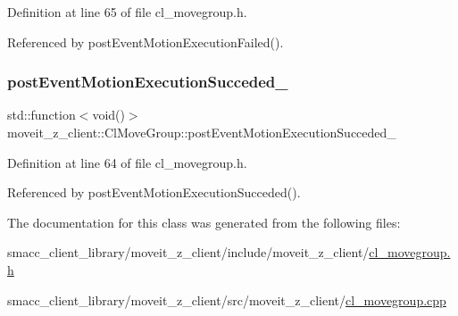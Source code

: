 Definition at line 65 of file cl\+\_\+movegroup.\+h.



Referenced by post\+Event\+Motion\+Execution\+Failed().

\mbox{\label{classmoveit__z__client_1_1ClMoveGroup_a9234c0edadb1f173c31fc8fa5430afcd}} 
\subsubsection{\texorpdfstring{post\+Event\+Motion\+Execution\+Succeded\+\_\+}{postEventMotionExecutionSucceded\_}}
{\footnotesize\ttfamily std\+::function$<$void()$>$ moveit\+\_\+z\+\_\+client\+::\+Cl\+Move\+Group\+::post\+Event\+Motion\+Execution\+Succeded\+\_\+\hspace{0.3cm}{\ttfamily [private]}}



Definition at line 64 of file cl\+\_\+movegroup.\+h.



Referenced by post\+Event\+Motion\+Execution\+Succeded().



The documentation for this class was generated from the following files\+:\begin{DoxyCompactItemize}
\item 
smacc\+\_\+client\+\_\+library/moveit\+\_\+z\+\_\+client/include/moveit\+\_\+z\+\_\+client/\hyperlink{cl__movegroup_8h}{cl\+\_\+movegroup.\+h}\item 
smacc\+\_\+client\+\_\+library/moveit\+\_\+z\+\_\+client/src/moveit\+\_\+z\+\_\+client/\hyperlink{cl__movegroup_8cpp}{cl\+\_\+movegroup.\+cpp}\end{DoxyCompactItemize}

